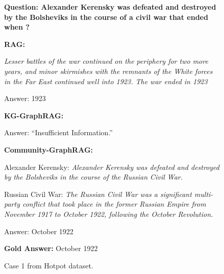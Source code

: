 \begin{figure}[!htb]
\begin{tcolorbox}[title={Case 1}]

\textbf{Question: Alexander Kerensky was defeated and destroyed by the Bolsheviks in the course of a civil war that ended when ?}


\textbf{RAG:}

\textit{Lesser battles of the war continued on the periphery for two more years, and minor skirmishes with the remnants of the White forces in the Far East continued well into 1923.  The war ended in 1923}

Answer: 1923


\textbf{KG-GraphRAG:}

Answer: “Insufficient Information.”

\textbf{Community-GraphRAG:}

Alexander Kerensky: \textit{Alexander Kerensky was defeated and destroyed by the Bolsheviks in the course of the Russian Civil War.}

Russian Civil War: \textit{The Russian Civil War was a significant multi-party conflict that took place in the former Russian Empire from November 1917 to October 1922, following the October Revolution.}

Answer: October 1922

\textbf{Gold Answer:}
October 1922

\end{tcolorbox}
\caption{Case 1 from Hotpot dataset.}
\label{app:fig:case1}
\end{figure}


